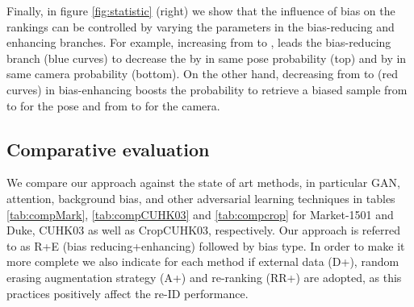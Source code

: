 \documentclass[10pt,twocolumn,letterpaper]{article}
\begin{document}
{Finally, in figure \ref{fig:statistic} (right) we show that  the influence of  bias on the rankings can be controlled by varying the parameters  in the bias-reducing and enhancing branches. For example, increasing  from  to , leads the bias-reducing branch (blue curves) to decrease the  by  in same pose probability (top) and by  in same camera  probability (bottom). On the other hand, decreasing  from  to  (red curves) in bias-enhancing boosts the probability to retrieve a biased sample from  to  for the pose and from  to  for the camera.}
\subsection{Comparative evaluation}
We compare our approach against the state of art methods, in particular GAN, attention, background bias, and other adversarial learning techniques in tables \ref{tab:compMark}, \ref{tab:compCUHK03} and \ref{tab:compcrop}  for Market-1501 and Duke, CUHK03 as well as CropCUHK03, respectively.  Our approach is referred to as R+E (bias reducing+enhancing) followed by bias type. In order to make it more complete we also indicate for each method if external data (D+), random erasing augmentation strategy (A+) and re-ranking (RR+) are adopted, as this practices positively affect the re-ID performance.
\end{document}
